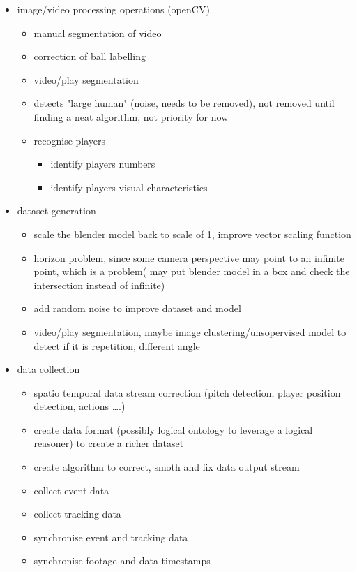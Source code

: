 \documentclass[
11pt,
twoside
]{report}
\begin{document}
\begin{itemize}
\item
  image/video processing operations (openCV)

  \begin{itemize}
  \item
    manual segmentation of video
  \item
    correction of ball labelling
  \item
    video/play segmentation
  \item
    detects "large human" (noise, needs to be removed), not removed until finding a neat algorithm, not priority for now
  \item
    recognise players

    \begin{itemize}
    \item
      identify players numbers
    \item
      identify players visual characteristics
    \end{itemize}
  \end{itemize}
\item
  dataset generation

  \begin{itemize}
  \item
    scale the blender model back to scale of 1, improve vector scaling function
  \item
      horizon problem, since some camera perspective may point to an infinite point, which is a problem( may put blender model in a box and check the intersection instead of infinite)
  \item
    add random noise to improve dataset and model
  \item
    video/play segmentation, maybe image clustering/unsopervised model to detect if it is repetition, different angle
  \end{itemize}
\item
  data collection

  \begin{itemize}
  \item
    spatio temporal data stream correction (pitch detection, player position detection, actions \ldots.)
  \item
    create data format (possibly logical ontology to leverage a logical reasoner) to create a richer dataset
  \item
    create algorithm to correct, smoth and fix data output stream
  \item
    collect event data
  \item
    collect tracking data
  \item
    synchronise event and tracking data
  \item
    synchronise footage and data timestamps


\end{itemize}
\end{itemize}
\end{document}
